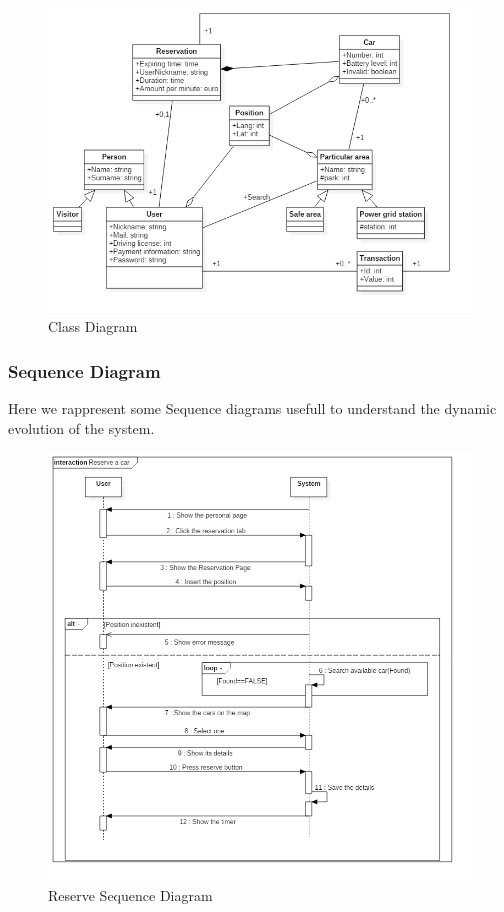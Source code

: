 \begin{figure}[htbp]
\centering
\includegraphics[width=\textwidth]{Images/UML/ClassDiagram}
\caption{Class Diagram}
\label{fig:class}
\end{figure}
\clearpage

\subsubsection{Sequence Diagram}
Here we rappresent some Sequence diagrams usefull to understand the dynamic evolution of the system.
\vspace{10pt}
\begin{figure}[htbp]
\centering
\includegraphics[width=\textwidth]{Images/UML/Reserve}
\caption{Reserve Sequence Diagram}
\label{fig:resseq}
\end{figure}
\clearpage

